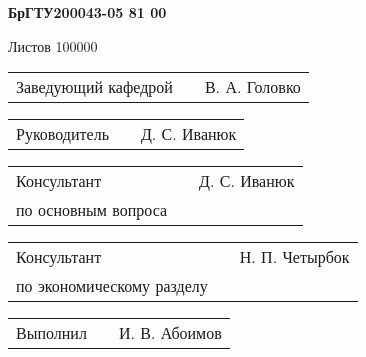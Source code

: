 \documentclass[a4paper]{article}
\begin{document}
\vspace{32pt}

\begin{Center}{
\cyrillicfontsf 
\englishfontsf
\bfseries
\fontsize{16pt}{0pt}\selectfont 
    БрГТУ200043-05 81 00
}\end{Center}

\vspace{22pt}

\begin{Center}{
\cyrillicfontsf 
\englishfontsf
\fontsize{16pt}{0pt}\selectfont 
    Листов 100000
}\end{Center}

\vspace{22pt}

\begin{FlushLeft} {
\cyrillicfontsf 
\englishfontsf
\fontsize{14pt}{0pt}\selectfont 

  \begin{tabular}{p{6.5cm} p{4.767cm} p{5.633cm}}
    \raggedleft Заведующий кафедрой & & В. А. Головко  
  \end{tabular}

  \vspace{14pt}
  
  \begin{tabular}{p{6.5cm} p{4.767cm} p{5.633cm}}
    \raggedleft Руководитель & & Д. С. Иванюк \\ 
  \end{tabular}

  \vspace{14pt}

  \begin{tabular}{p{6.5cm} p{4.767cm} p{5.633cm}}
    \raggedleft Консультант & & Д. С. Иванюк \\
    \raggedleft по основным вопроса & &
  \end{tabular}

  \vspace{14pt}

  \begin{tabular}{p{6.5cm} p{4.767cm} p{5.633cm}}
    \raggedleft Консультант & & Н. П. Четырбок \\
    \raggedleft по экономическому разделу & &
  \end{tabular}

  \vspace{14pt}

  \begin{tabular}{p{6.5cm} p{4.767cm} p{5.633cm}}
    \raggedleft Выполнил & & И. В. Абоимов \\
  \end{tabular}

}
\end{FlushLeft}
\end{document}
